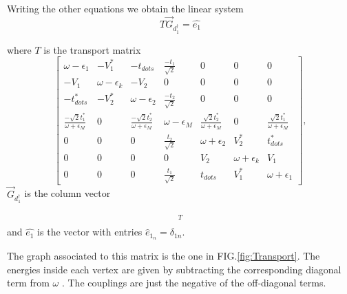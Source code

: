 \documentclass[showpacs,aps,prb,reprint,superscriptaddress]{revtex4-1}
\begin{document}
Writing the other equations  we obtain the  linear system
\begin{equation}
    T \vec{G}_{d^\dagger_1} = \hat{e_1}
\end{equation}

\noindent where $T$ is the transport matrix 
\begin{equation}
\left[\begin{array}{ccccccc}
\omega-\epsilon_{1} & -V_{1}^{*} & -t_{dots} & \frac{-t_{1}}{\sqrt{2}} & 0 & 0 & 0\\
-V_{1} & \omega-\epsilon_{k} & -V_{2} & 0 & 0 & 0 & 0\\
-t_{dots}^{*} & -V_{2}^{*} & \omega-\epsilon_{2} & \frac{-t_{2}}{\sqrt{2}} & 0 & 0 & 0\\
\frac{-\sqrt{2}t_{1}^{*}}{\omega+\epsilon_{M}} & 0 & \frac{-\sqrt{2}t_{2}^{*}}{\omega+\epsilon_{M}} & \omega-\epsilon_{M} & \frac{\sqrt{2}t_{2}^{*}}{\omega+\epsilon_{M}} & 0 & \frac{\sqrt{2}t_{1}^{*}}{\omega+\epsilon_{M}}\\
0 & 0 & 0 & \frac{t_{2}}{\sqrt{2}} & \omega+\epsilon_{2} & V_{2}^{*} & t_{dots}^{*}\\
0 & 0 & 0 & 0 & V_{2} & \omega+\epsilon_{k} & V_{1}\\
0 & 0 & 0 & \frac{t_{1}}{\sqrt{2}} & t_{dots} & V_{1}^{*} & \omega+\epsilon_{1}
\end{array}\right],
\end{equation}
 \noindent $\vec{G}_{d^\dagger_1}$  is the column vector
 
 \begin{align*}
    [ \Green{d_{\mathbf{1\downarrow}},d_{1\downarrow}^{\dagger}},&\Green{c_{k\downarrow},d_{1\downarrow}^{\dagger}},\Green{d_{2\downarrow},d_{1\downarrow}^{\dagger}},\Green{f_{\downarrow},  d_{1\downarrow}^{\dagger}}, \\ & \Green{d_{2\downarrow}^{\dagger},d_{1\downarrow}^{\dagger}},\Green{c_{k\downarrow}^{\dagger},d_{1\downarrow}^{\dagger}},\Green{d_{1\downarrow}^{\dagger},d_{1\downarrow}^{\dagger}} ]^T
 \end{align*}
and $\hat{e_1}$ is the vector with entries  $\hat{e}_{1_n} =\delta_{1n}$. 

The graph associated to this matrix is the one in FIG.\ref{fig:Transport}. The energies inside each vertex are given by subtracting the corresponding diagonal term from $\omega$ . The couplings are just the negative of the off-diagonal terms. 
\end{document}
